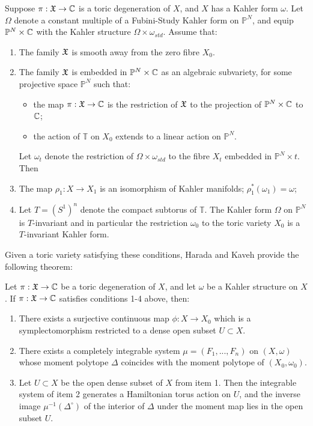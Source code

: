 	Suppose $\pi:\mathfrak{X}\to\mathbb{C}$ is a toric degeneration of $X$, and $X$ has a Kahler form $\omega$. Let $\Omega$ denote a constant multiple of a Fubini-Study Kahler form on $\mathbb{P}^N$, and equip $\mathbb{P}^N\times\mathbb{C}$ with the Kahler structure $\Omega \times \omega_{std}$. Assume that:
	\begin{enumerate}
		\item The family $\mathfrak{X}$ is smooth away from the zero fibre $X_0$.
		\item The family $\mathfrak{X}$ is embedded in $\mathbb{P}^N\times \mathbb{C}$ as an algebraic subvariety, for some projective space $\mathbb{P}^N$ such that:
		\begin{itemize}
			\item the map $\pi:\mathfrak{X}\to\mathbb{C}$ is the restriction of $\mathfrak{X}$ to the projection of $\mathbb{P}^N\times \mathbb{C}$ to $\mathbb{C}$;
			\item the action of $\mathbb{T}$ on $X_0$ extends to a linear action on $\mathbb{P}^N$.
		\end{itemize}
		Let $\omega_t$ denote the restriction of $\Omega\times \omega_{std}$ to the fibre $X_t$ embedded in $\mathbb{P}^N \times {t}$. Then
		\item The map $\rho_1 : X\to X_1$ is an isomorphism of Kahler manifolds; $\rho_1^\ast(\omega_1) = \omega$;
		\item Let $T = (S^1)^n$ denote the compact subtorus of $\mathbb{T}$. The Kahler form $\Omega$ on $\mathbb{P}^N$ is $T$-invariant and in particular the restriction $\omega_0$ to the toric variety $X_0$ is a $T$-invariant Kahler form.
	\end{enumerate}
	Given a toric variety satisfying these conditions, Harada and Kaveh provide the following theorem:
	\begin{theorem}
		\label{t:haradakaveh}
		Let $\pi:\mathfrak{X}\to \mathbb{C}$ be a toric degeneration of $X$, and let $\omega$ be a Kahler structure on $X$. If $\pi:\mathfrak{X}\to\mathbb{C}$ satisfies conditions 1-4 above, then:
		\begin{enumerate}
			\item There exists a surjective continuous map $\phi:X\to X_0$ which is a symplectomorphism restricted to a dense open subset $U\subset X$.
			\item There exists a completely integrable system $\mu = (F_1,...,F_n)$ on $(X,\omega)$ whose moment polytope $\Delta$ coincides with the moment polytope of $(X_0, \omega_0)$.
			\item Let $U\subset X$ be the open dense subset of $X$ from item 1. Then the integrable system of item 2 generates a Hamiltonian torus action on $U$, and the inverse image $\mu^{-1}(\Delta^\circ)$ of the interior of $\Delta$ under the moment map lies in the open subset $U$.
		\end{enumerate}
	\end{theorem}
	
